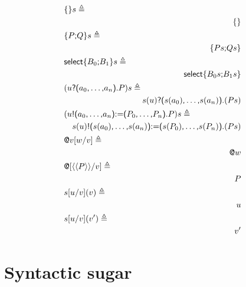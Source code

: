 \begin{eqnarray}
  \lefteqn{ \textsf{\{} \textsf{\}}s \triangleq } \\
  & & \mbox{} \textsf{\{} \textsf{\}} \\
  \lefteqn{ \textsf{\{} P \textsf{;} Q \textsf{\}}s \triangleq } \\
  & & \mbox{} \textsf{\{} Ps \textsf{;} Qs \textsf{\}} \\
  \lefteqn{ \textsf{select} \textsf{\{} B_0 \textsf{;} B_1 \textsf{\}}s \triangleq } \\
  & & \mbox{} \textsf{select} \textsf{\{} B_{0}s \textsf{;} B_{1}s \textsf{\}} \\
  \lefteqn{ (u \textsf{?} \textsf{(} a_0 \textsf{,} \ldots \textsf{,} a_n \textsf{)} \textsf{.} P)s \triangleq } \\
  & & \mbox{} s(u) \textsf{?} \textsf{(} s(a_0) \textsf{,} \ldots \textsf{,} s(a_n) \textsf{)} \textsf{.} (Ps) \\
  \lefteqn{ (u \textsf{!} \textsf{(} a_0 \textsf{,} \ldots \textsf{,} a_n \textsf{)} \textsf{:=} \textsf{(} P_0 \textsf{,} \ldots \textsf{,} P_n \textsf{)} \textsf{.} P)s \triangleq } \\
  & & s(u) \textsf{!} \textsf{(} s(a_0) \textsf{,} \ldots \textsf{,} s(a_n) \textsf{)} \textsf{:=} \textsf{(} s(P_0) \textsf{,} \ldots \textsf{,} s(P_n) \textsf{)} \textsf{.} (Ps) \\
  \lefteqn{ \textsf{@}v[w/v] \triangleq } \\
  & & \mbox{} \textsf{@}w \\
  \lefteqn{ \textsf{@}[\langle\langle P \rangle\rangle/v] \triangleq } \\
  & & \mbox{} P \\
  \lefteqn{ s[u/v](v) \triangleq } \\
  & & \mbox{} u \\
  \lefteqn{ s[u/v](v') \triangleq } \\
  & & \mbox{} v'
\end{eqnarray}

\section{Syntactic sugar}


